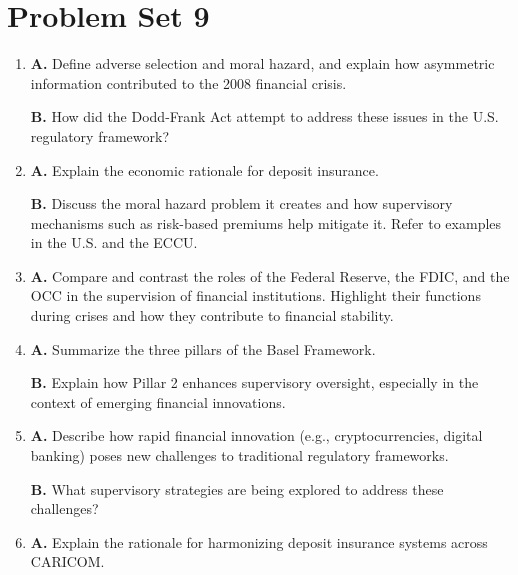 \newpage

\section{Problem Set 9}

\begin{enumerate}

    \item 
    \textbf{A.} Define adverse selection and moral hazard, and explain how asymmetric information contributed to the 2008 financial crisis. 
    
    \textbf{B.} How did the Dodd-Frank Act attempt to address these issues in the U.S. regulatory framework?

    \item
    \textbf{A.} Explain the economic rationale for deposit insurance. 
    
    \textbf{B.} Discuss the moral hazard problem it creates and how supervisory mechanisms such as risk-based premiums help mitigate it. Refer to examples in the U.S. and the ECCU.

    \item
    \textbf{A.} Compare and contrast the roles of the Federal Reserve, the FDIC, and the OCC in the supervision of financial institutions. Highlight their functions during crises and how they contribute to financial stability.

    \item
    \textbf{A.} Summarize the three pillars of the Basel Framework.
    
    \textbf{B.} Explain how Pillar 2 enhances supervisory oversight, especially in the context of emerging financial innovations.

    \item
    \textbf{A.} Describe how rapid financial innovation (e.g., cryptocurrencies, digital banking) poses new challenges to traditional regulatory frameworks.
    
    \textbf{B.} What supervisory strategies are being explored to address these challenges?

    \item
    \textbf{A.} Explain the rationale for harmonizing deposit insurance systems across CARICOM.

\end{enumerate}

